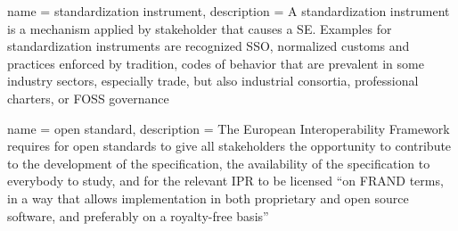  { name = {standardization instrument},
  description = { A standardization instrument is a mechanism applied
    by stakeholder that causes a \gls{SE}. Examples for
    standardization instruments are recognized \gls{SSO}, normalized
    customs and practices enforced by tradition, codes of behavior
    that are prevalent in some industry sectors, especially trade, but
    also industrial consortia, professional charters, or \gls{FOSS}
    governance } }

 { name = {open standard}, description = {
    The European Interoperability Framework requires for open
    standards to give all stakeholders the opportunity to contribute
    to the development of the specification, the availability of the
    specification to everybody to study, and for the relevant
    \gls{IPR} to be licensed ``on \gls{FRAND} terms, in a way that
    allows implementation in both proprietary and open source
    software, and preferably on a royalty-free
    basis''\cite{citeulike:14532877} } }
